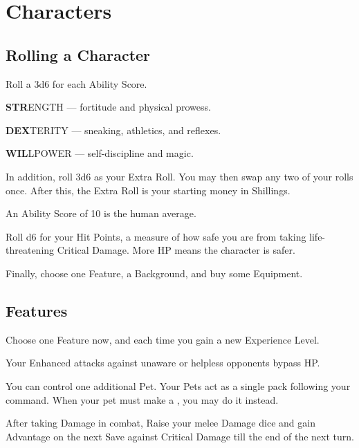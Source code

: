 \documentclass[itdr]{subfiles}
\begin{document}
\chapter{Characters}
\label{ch:characters}

\section{Rolling a Character}

Roll a 3d6 for each Ability Score.

\textbf{STR}ENGTH --- fortitude and physical prowess.

\textbf{DEX}TERITY --- sneaking, athletics, and reflexes.

\textbf{WIL}LPOWER --- self-discipline and magic.

In addition, roll 3d6 as your Extra Roll. You may then swap any two of your rolls once. After this, the Extra Roll is your starting money in Shillings.

An Ability Score of 10 is the human average.

Roll d6 for your Hit Points, a measure of how safe you are from taking life-threatening Critical \mbox{Damage}. More HP means the character is safer.

Finally, choose one Feature, a Background, and buy some Equipment.

\section{Features}

Choose one Feature now, and each time you gain a new Experience Level.

\vfill
{}
Your Enhanced attacks against unaware or helpless opponents bypass HP.

\vfill
{}\featmt
You can control one additional Pet. Your Pets act as a single pack following your command. When your pet must make a , you may do it instead.

\vfill
{}\feathp
After taking Damage in combat, Raise your melee Damage dice and gain Advantage on the next Save against Critical Damage till the end of the next turn.
\end{document}
